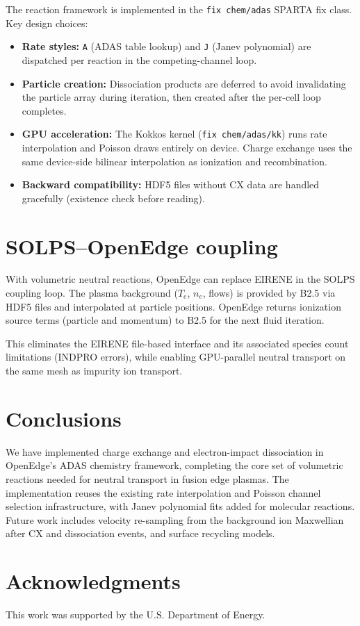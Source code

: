 \documentclass[preprint,12pt]{elsarticle}
\begin{document}
The reaction framework is implemented in the \texttt{fix chem/adas} SPARTA fix class.
Key design choices:
\begin{itemize}
  \item \textbf{Rate styles:} \texttt{A} (ADAS table lookup) and \texttt{J} (Janev polynomial)
    are dispatched per reaction in the competing-channel loop.
  \item \textbf{Particle creation:} Dissociation products are deferred to avoid invalidating
    the particle array during iteration, then created after the per-cell loop completes.
  \item \textbf{GPU acceleration:} The Kokkos kernel (\texttt{fix chem/adas/kk}) runs rate
    interpolation and Poisson draws entirely on device. Charge exchange uses the same
    device-side bilinear interpolation as ionization and recombination.
  \item \textbf{Backward compatibility:} HDF5 files without CX data are handled gracefully
    (existence check before reading).
\end{itemize}

\section{SOLPS--OpenEdge coupling}
\label{sec:coupling}

With volumetric neutral reactions, OpenEdge can replace EIRENE in the SOLPS coupling loop.
The plasma background ($T_e$, $n_e$, flows) is provided by B2.5 via HDF5 files and
interpolated at particle positions. OpenEdge returns ionization source terms (particle
and momentum) to B2.5 for the next fluid iteration.

This eliminates the EIRENE file-based interface and its associated species count limitations
(INDPRO errors), while enabling GPU-parallel neutral transport on the same mesh as impurity
ion transport.

\section{Conclusions}
\label{sec:conclusions}

We have implemented charge exchange and electron-impact dissociation in OpenEdge's ADAS
chemistry framework, completing the core set of volumetric reactions needed for neutral
transport in fusion edge plasmas. The implementation reuses the existing rate interpolation
and Poisson channel selection infrastructure, with Janev polynomial fits added for molecular
reactions. Future work includes velocity re-sampling from the background ion Maxwellian
after CX and dissociation events, and surface recycling models.

\section*{Acknowledgments}
This work was supported by the U.S. Department of Energy.



\end{document}
